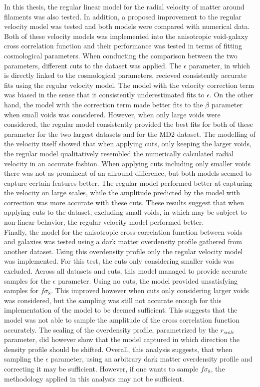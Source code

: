 In this thesis, the regular linear model for the radial velocity of matter around filaments was also tested. In addition, a proposed improvement to the regular velocity model was tested and both models were compared with numerical data. Both of these velocity models was implemented into the anisotropic void-galaxy cross correlation function and their performance was tested in terms of fitting cosmological parameters. When conducting the comparison between the two parameters, different cuts to the dataset was applied. The $\epsilon$ parameter, in which is directly linked to the cosmological parameters, recieved consistently accurate fits using the regular velocity model. The model with the velocity correction term was biased in the sense that it consistently underestimated fits to $\epsilon$. On the other hand, the model with the correction term made better fits to the $\beta$ parameter when small voids was considered. However, when only large voids were considered, the regular model consistently provided the best fits for both of these parameter for the two largest datasets and for the MD2 dataset. The modelling of the velocity itself showed that when applying cuts, only keeping the larger voids, the regular model qualitatively resembled the numerically calculated radial velocity in an accurate fashion. When applying cuts including only smaller voids there was not as prominent of an allround difference, but both models seemed to capture certain features better. The regular model performed better at capturing the velocity on large scales, while the amplitude predicted by the model with correction was more accurate with these cuts. These results suggest that when applying cuts to the dataset, excluding small voids, in which may be subject to non-linear behavior, the regular velocity model performed better.\\\indent
Finally, the model for the anisotropic cross-correlation function between voids and galaxies was tested using a dark matter overdensity profile gathered from another dataset. Using this overdensity profile only the regular velocity model was implemented. For this test, the cuts only considering smaller voids was excluded. Across all datasets and cuts, this model managed to provide accurate samples for the $\epsilon$ parameter. Using no cuts, the model provided unsatisfying samples for $f\sigma_8$. This improved however when cuts only considering larger voids was considered, but the sampling was still not accurate enough for this implementation of the model to be deemed sufficient.  This suggests that the model was not able to sample the amplitude of the cross correlation function accurately. The scaling of the overdensity profile, parametrized by the $r_{scale}$ parameter, did however show that the model captured in which direction the density profile should be shifted. Overall, this analysis suggests, that when sampling the $\epsilon$ parameter, using an arbitrary dark matter overdensity profile and correcting it may be sufficient. However, if one wants to sample $f\sigma_8$, the methodology applied in this analysis may not be sufficient.

